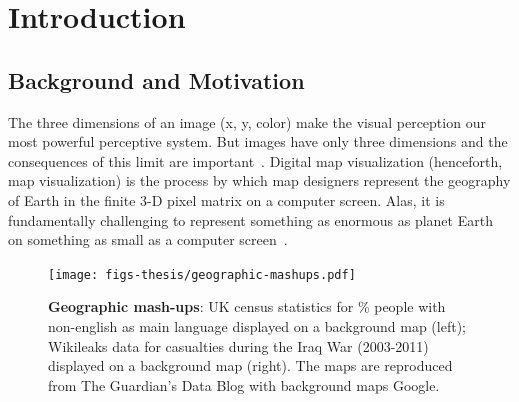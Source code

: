 \documentclass[11pt, oneside]{report}
\begin{document}
{%



\chapter{Introduction}
\label{chapter:introduction}

\section{Background and Motivation}
\label{sec:introduction:background:and:motivation}
The three dimensions of an image (x, y, color) make the visual perception our most powerful perceptive system. But images have only three dimensions and the consequences of this limit are important~\cite{bertin1973semiologie}. Digital map visualization (henceforth, map visualization) is the process by which map designers represent the geography of Earth in the finite 3-D pixel matrix on a computer screen. Alas, it is fundamentally challenging to represent something as enormous as planet Earth on something as small as a computer screen~\cite{dillard1974pilgrim}.

\begin{figure}[htbp]
\begin{center}
\texttt{[image: figs-thesis/geographic-mashups.pdf]}
\caption{\textbf{Geographic mash-ups}: UK census statistics for \% people with non-english as main language displayed on a background map (left); Wikileaks data for casualties during the Iraq War (2003-2011) displayed on a background map (right). The maps are reproduced from The Guardian's Data Blog with background maps  Google.}
\label{fig:introduction:background:mashups}
\end{center}
\vspace*{-4ex}
\end{figure}

}
\end{document}
